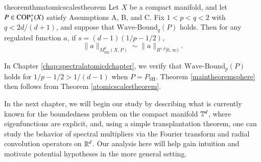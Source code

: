 \begin{restatable}{theorem}{thmatomicscalestheorem} \label{atomicscalestheorem}
  Let $X$ be a compact manifold, and let $P \in {\text{COP}^{+}_{{1}}}(X)$ satisfy Assumptions A, B, and C. Fix $1 < p < q < 2$ with $q < 2d/(d+1)$, and suppose that $\text{Wave-Bound}_q(P)$ holds. Then for any regulated function $a$, if $s = (d-1)(1/p - 1/2)$,
  \[ \| a \|_{M^p_{\text{Dil}}(X,P)} \sim \| a \|_{R^{s,p}[0,\infty)}. \]
\end{restatable}

In Chapter \ref{chap:spectralatomicdchapter}, we verify that $\text{Wave-Bound}_p(P)$ holds for $1/p - 1/2 > 1/(d-1)$ when $P = P_{\text{SH}}$. Theorem \ref{maintheoremsphere} then follows from Theorem \ref{atomicscalestheorem}.%



In the next chapter, we will begin our study by describing what is currently known for the boundedness problem on the compact manifold $\operatorname{\mathbb{T}}^d$, where eigenfunctions are explicit, and, using a simple transplantation theorem, one can study the behavior of spectral multipliers via the Fourier transform and radial convolution operators on $\operatorname{\mathbb{R}}^d$. Our analysis here will help gain intuition and motivate potential hypotheses in the more general setting.


